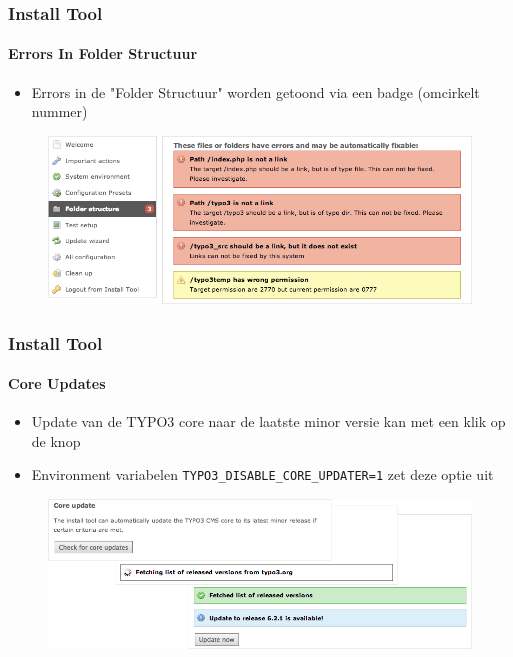 \begin{frame}[fragile]
	\frametitle{Install Tool}
	\framesubtitle{Errors In Folder Structuur}

	\begin{itemize}
		\item Errors in de "Folder Structuur" worden getoond via een badge (omcirkelt nummer)
	\end{itemize}

	\begin{figure}
		\includegraphics[width=0.95\linewidth]{Images/InstallTool/ErrorsInFolderStructure.png}
	\end{figure}

\end{frame}


\begin{frame}[fragile]
	\frametitle{Install Tool}
	\framesubtitle{Core Updates}

	\begin{itemize}
		\item Update van de TYPO3 core naar de laatste minor versie kan met een klik op de knop
		\item Environment variabelen \texttt{TYPO3\_DISABLE\_CORE\_UPDATER=1} zet deze optie uit
	\end{itemize}

	\begin{figure}
		\includegraphics[width=0.95\linewidth]{Images/InstallTool/CoreUpdate.png}
	\end{figure}

\end{frame}

